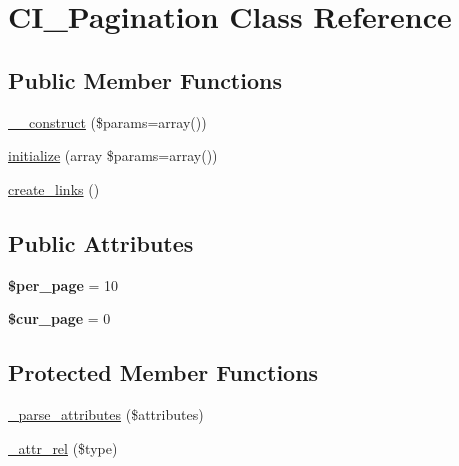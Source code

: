 \hypertarget{class_c_i___pagination}{}\section{C\+I\+\_\+\+Pagination Class Reference}
\label{class_c_i___pagination}
\subsection*{Public Member Functions}
\begin{DoxyCompactItemize}
\item 
\mbox{\hyperlink{class_c_i___pagination_ae95f7119c3793c9f65f64c714f85b504}{\+\_\+\+\_\+construct}} (\$params=array())
\item 
\mbox{\hyperlink{class_c_i___pagination_a7f41ce5c5aa58da0db8cdd248f499cab}{initialize}} (array \$params=array())
\item 
\mbox{\hyperlink{class_c_i___pagination_abc25fb568539eaae7511b362384896cd}{create\+\_\+links}} ()
\end{DoxyCompactItemize}
\subsection*{Public Attributes}
\begin{DoxyCompactItemize}
\item 
\mbox{\label{class_c_i___pagination_a8519a8b2d991149dd757e198c6030781}} 
{\bfseries \$per\+\_\+page} = 10
\item 
\mbox{\label{class_c_i___pagination_a028f832395cd87a5a4d5fcbf1877f757}} 
{\bfseries \$cur\+\_\+page} = 0
\end{DoxyCompactItemize}
\subsection*{Protected Member Functions}
\begin{DoxyCompactItemize}
\item 
\mbox{\hyperlink{class_c_i___pagination_a37c36bdd43e29df1fb459c8b46850100}{\+\_\+parse\+\_\+attributes}} (\$attributes)
\item 
\mbox{\hyperlink{class_c_i___pagination_ac305307ee0c39e5a18429f9b54953d93}{\+\_\+attr\+\_\+rel}} (\$type)
\end{DoxyCompactItemize}
